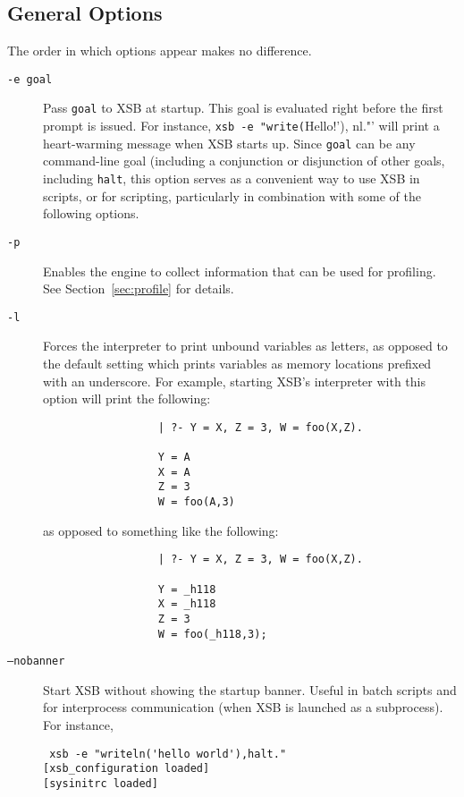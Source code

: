 

\subsection{General Options}
The order in which options appear makes no difference.
\begin{description}
\item[{\tt -e goal}] Pass {\tt goal} to XSB at startup. This goal is
  evaluated right before the first prompt is issued. For instance,
  \verb'xsb -e "write('Hello!'), nl."'  will print a heart-warming
  message when XSB starts up.  Since {\tt goal} can be any
  command-line goal (including a conjunction or disjunction of other
  goals, including {\tt halt}, this option serves as a convenient way
  to use XSB in scripts, or for scripting, particularly in combination
  with some of the following options.
%
\item[{\tt -p}] Enables the engine to collect information that can be
  used for profiling.  See Section~\ref{sec:profile} for details.
%
\item[{\tt -l}] Forces the interpreter to print unbound variables as
	letters, as opposed to the default setting which prints
	variables as memory locations prefixed with an underscore.
	For example, starting XSB's interpreter with this option will
	print the following:
        \begin{verbatim}
                  | ?- Y = X, Z = 3, W = foo(X,Z).

                  Y = A
                  X = A
                  Z = 3
                  W = foo(A,3)
	\end{verbatim}
	as opposed to something like the following:
	\begin{verbatim}
                  | ?- Y = X, Z = 3, W = foo(X,Z).

                  Y = _h118
                  X = _h118
                  Z = 3
                  W = foo(_h118,3);
	\end{verbatim}
  \item[{\tt --nobanner}] Start XSB without showing the startup banner.
    Useful in batch scripts and for interprocess communication (when XSB is
    launched as a subprocess).  For instance, 
\begin{verbatim}
 xsb -e "writeln('hello world'),halt."
[xsb_configuration loaded]
[sysinitrc loaded]


\end{verbatim}
\end{description}
